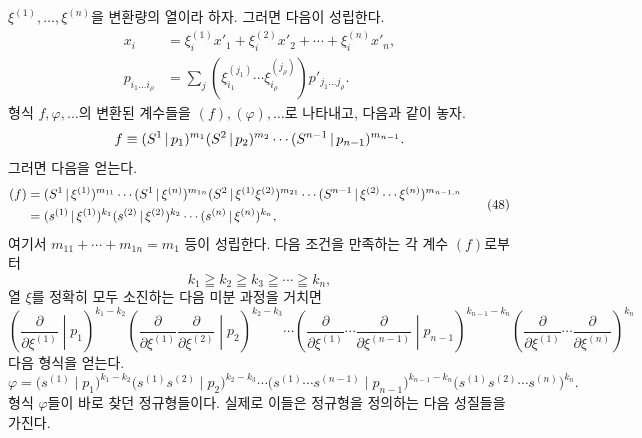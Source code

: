 $\xi^{(1)},\ldots,\xi^{(n)}$을 변환량의 열이라 하자. 그러면 다음이 성립한다.
\begin{equation}
\begin{aligned}
x_i&=\xi_i^{(1)}x'_1+\xi_i^{(2)}x'_2+\cdots+\xi_i^{(n)}x'_n,\\
p_{i_1\ldots i_\rho}&=\sum_j(\xi_{i_1}^{(j_1)}\cdots \xi_{i_\rho}^{(j_\rho)})p'_{j_1\ldots j_\rho}.
\end{aligned}
\tag{47}
\end{equation}
형식 $f,\varphi,\ldots$의 변환된 계수들을 $(f),(\varphi),\ldots$로 나타내고, 다음과 같이 놓자.
\[
 f\equiv(S^1\,|\,p_1)^{m_1}(S^2\,|\,p_2)^{m_2}\cdots(S^{n-1}\,|\,p_{n-1})^{m_{n-1}}.
\]
그러면 다음을 얻는다.
\begin{equation}
\begin{aligned}
(f)&=(S^1\,|\,\xi^{(1)})^{m_{11}}\cdots(S^1\,|\,\xi^{(n)})^{m_{1n}}
(S^2\,|\,\xi^{(1)}\xi^{(2)})^{m_{21}}\cdots
(S^{n-1}\,|\,\xi^{(2)}\cdots\xi^{(n)})^{m_{n-1,n}}\\
&=(s^{(1)}\,|\,\xi^{(1)})^{k_1}(s^{(2)}\,|\,\xi^{(2)})^{k_2}\cdots(s^{(n)}\,|\,\xi^{(n)})^{k_n},
\end{aligned}
\tag{48}
\end{equation}
여기서 $m_{11}+\cdots+m_{1n}=m_1$ 등이 성립한다. 다음 조건을 만족하는 각 계수 $(f)$로부터
\begin{equation}
 k_1\geqq k_2\geqq k_3\geqq\cdots\geqq k_n,
\tag{49}
\end{equation}
열 $\xi$를 정확히 모두 소진하는 다음 미분 과정을 거치면
\begin{equation}
\left(\frac{\partial}{\partial\xi^{(1)}}\middle|p_1\right)^{k_1-k_2}
\left(\frac{\partial}{\partial\xi^{(1)}}\frac{\partial}{\partial\xi^{(2)}}\middle|p_2\right)^{k_2-k_3}
\cdots
\left(\frac{\partial}{\partial\xi^{(1)}}\cdots\frac{\partial}{\partial\xi^{(n-1)}}\middle|p_{n-1}\right)^{k_{n-1}-k_n}
\left(\frac{\partial}{\partial\xi^{(1)}}\cdots\frac{\partial}{\partial\xi^{(n)}}\right)^{k_n}
\tag{50}
\end{equation}
다음 형식을 얻는다.
\begin{equation}
 \varphi=\bigl(s^{(1)}\mid p_1\bigr)^{k_1-k_2}
 \bigl(s^{(1)}s^{(2)}\mid p_2\bigr)^{k_2-k_3}\cdots
 \bigl(s^{(1)}\cdots s^{(n-1)}\mid p_{n-1}\bigr)^{k_{n-1}-k_n}
 \bigl(s^{(1)}s^{(2)}\cdots s^{(n)}\bigr)^{k_n}.
\tag{51}
\end{equation}
형식 $\varphi$들이 바로 찾던 정규형들이다. 실제로 이들은 정규형을 정의하는 다음 성질들을 가진다.

